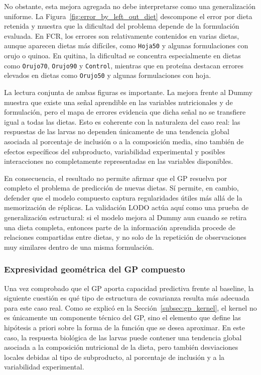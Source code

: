 No obstante, esta mejora agregada no debe interpretarse como una generalización uniforme. La Figura~\ref{fig:error_by_left_out_diet} descompone el error por dieta retenida y muestra que la dificultad del problema depende de la formulación evaluada. En FCR, los errores son relativamente contenidos en varias dietas, aunque aparecen dietas más difíciles, como \texttt{Hoja50} y algunas formulaciones con orujo o quinoa. En quitina, la dificultad se concentra especialmente en dietas como \texttt{Orujo70}, \texttt{Orujo90} y \texttt{Control}, mientras que en proteína destacan errores elevados en dietas como \texttt{Orujo50} y algunas formulaciones con hoja.

La lectura conjunta de ambas figuras es importante. La mejora frente al Dummy muestra que existe una señal aprendible en las variables nutricionales y de formulación, pero el mapa de errores evidencia que dicha señal no se transfiere igual a todas las dietas. Esto es coherente con la naturaleza del caso real: las respuestas de las larvas no dependen únicamente de una tendencia global asociada al porcentaje de inclusión o a la composición media, sino también de efectos específicos del subproducto, variabilidad experimental y posibles interacciones no completamente representadas en las variables disponibles.

En consecuencia, el resultado no permite afirmar que el GP resuelva por completo el problema de predicción de nuevas dietas. Sí permite, en cambio, defender que el modelo compuesto captura regularidades útiles más allá de la memorización de réplicas. La validación LODO actúa aquí como una prueba de generalización estructural: si el modelo mejora al Dummy aun cuando se retira una dieta completa, entonces parte de la información aprendida procede de relaciones compartidas entre dietas, y no solo de la repetición de observaciones muy similares dentro de una misma formulación.

\subsubsection{Expresividad geométrica del GP compuesto}\label{subsubsec:expresividad_gp_compuesto}

Una vez comprobado que el GP aporta capacidad predictiva frente al baseline, la siguiente cuestión es qué tipo de estructura de covarianza resulta más adecuada para este caso real. Como se explicó en la Sección~\ref{subsec:gp_kernel}, el kernel no es únicamente un componente técnico del GP, sino el elemento que define las hipótesis a priori sobre la forma de la función que se desea aproximar. En este caso, la respuesta biológica de las larvas puede contener una tendencia global asociada a la composición nutricional de la dieta, pero también desviaciones locales debidas al tipo de subproducto, al porcentaje de inclusión y a la variabilidad experimental.

